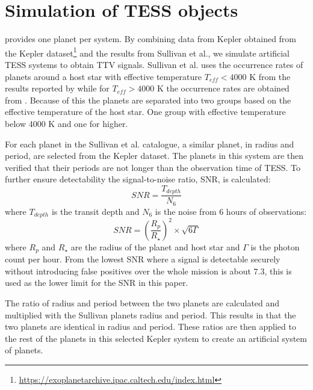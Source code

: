 \documentclass[12pt]{report}
\begin{document}
\section{Simulation of TESS objects}
\label{simTESS}
	\cite{2015ApJ...809...77S} provides one planet per system. By combining data from Kepler obtained from the Kepler dataset\footnote{\url{https://exoplanetarchive.ipac.caltech.edu/index.html}} and the results from Sullivan et al., we simulate artificial TESS systems to obtain TTV signals. Sullivan et al. uses the occurrence rates of planets around a host star with effective temperature $T_{eff} < 4000$ K from the results reported by \cite{2015ApJ...807...45D} while for $T_{eff} > 4000$ K the occurrence rates are obtained from \cite{2013ApJ...766...81F}. Because of this the planets are separated into two groups based on the effective temperature of the host star. One group with effective temperature below 4000 K and one for higher.

	For each planet in the Sullivan et al. catalogue, a similar planet, in radius and period, are selected from the Kepler dataset. The planets in this system are then verified that their periods are not longer than the observation time of TESS. To further ensure detectability the signal-to-noise ratio, SNR, is calculated:
	\begin{equation}
	SNR = \frac{T_{depth}}{N_{6}}
	\end{equation}	
	where $T_{depth}$ is the transit depth and $N_{6}$ is the noise from 6 hours of observations:
	\begin{equation}
	SNR = \left(\frac{R_p}{R_{\star}}\right)^2 \times \sqrt{6\Gamma}
	\end{equation}
	where $R_p$ and $R_{\star}$ are the radius of the planet and host star and $\Gamma$ is the photon count per hour. From \cite{2015ApJ...809...77S} the lowest SNR where a signal is detectable securely without introducing false positives over the whole mission is about $7.3$, this is used as the lower limit for the SNR in this paper.
	
	The ratio of radius and period between the two planets are calculated and multiplied with the Sullivan planets radius and period. This results in that the two planets are identical in radius and period. These ratios are then applied to the rest of the planets in this selected Kepler system to create an artificial system of planets.  
	
\end{document}

